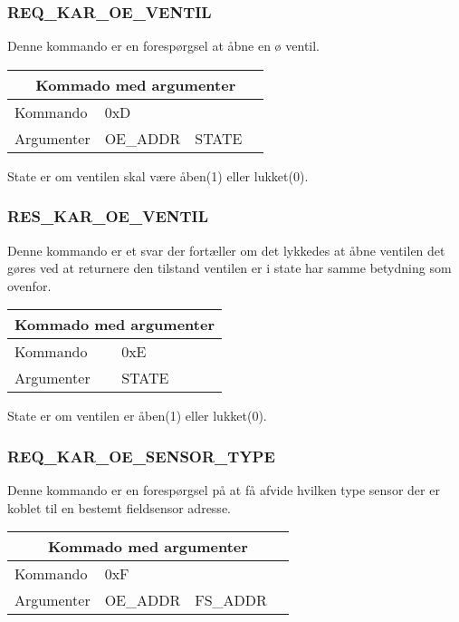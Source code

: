 \subsubsection{REQ\_KAR\_OE\_VENTIL}
Denne kommando er en forespørgsel at åbne en ø ventil.

\begin{table}[H]
\setlength{\parindent}{12pt}
\begin{tabular}{|l|lcc|}
\hline
\multicolumn{4}{|c|}{Kommado med argumenter}\\\hline
Kommando & 0xD & & \\
Argumenter & OE\_ADDR & STATE & \\\hline
\end{tabular}
\end{table}

State er om ventilen skal være åben(1) eller lukket(0).

\subsubsection{RES\_KAR\_OE\_VENTIL}
Denne kommando er et svar der fortæller om det lykkedes at åbne ventilen det gøres ved at returnere den tilstand ventilen er i state har samme betydning som ovenfor.

\begin{table}[H]
\setlength{\parindent}{12pt}
\begin{tabular}{|l|lcc|}
\hline
\multicolumn{4}{|c|}{Kommado med argumenter}\\\hline
Kommando & 0xE & & \\
Argumenter & STATE & & \\\hline
\end{tabular}
\end{table}

State er om ventilen er åben(1) eller lukket(0).

\subsubsection{REQ\_KAR\_OE\_SENSOR\_TYPE}
Denne kommando er en forespørgsel på at få afvide hvilken type sensor der er koblet til en bestemt fieldsensor adresse.

\begin{table}[H]
\setlength{\parindent}{12pt}
\begin{tabular}{|l|lcc|}
\hline
\multicolumn{4}{|c|}{Kommado med argumenter}\\\hline
Kommando & 0xF & & \\
Argumenter & OE\_ADDR & FS\_ADDR & \\\hline
\end{tabular}
\end{table}


